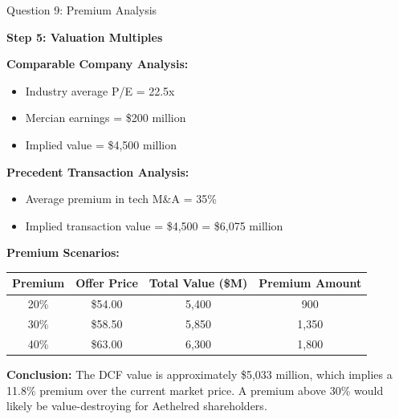 \documentclass[aspectratio=169]{beamer}
\begin{document}
	\begin{frame}{Question 9: Premium Analysis}
		
		\textbf{Step 5: Valuation Multiples}
		
		\textbf{Comparable Company Analysis:}
		\begin{itemize}
			\item Industry average P/E = 22.5x
			\item Mercian earnings = \$200 million
			\item Implied value = \$4,500 million
		\end{itemize}
		
		\textbf{Precedent Transaction Analysis:}
		\begin{itemize}
			\item Average premium in tech M&A = 35\%
			\item Implied transaction value = \$4,500  = \$6,075 million
		\end{itemize}
		
		\textbf{Premium Scenarios:}
		
		\begin{table}[h]
			\centering
			\begin{tabular}{|c|c|c|c|}
				\hline
				\textbf{Premium} & \textbf{Offer Price} & \textbf{Total Value (\$M)} & \textbf{Premium Amount} \\
				\hline
				20\% & \$54.00 & 5,400 & 900 \\
				30\% & \$58.50 & 5,850 & 1,350 \\
				40\% & \$63.00 & 6,300 & 1,800 \\
				\hline
			\end{tabular}
		\end{table}
		
		\textbf{Conclusion:}
		The DCF value is approximately \$5,033 million, which implies a 11.8\% premium over the current market price. A premium above 30\% would likely be value-destroying for Aethelred shareholders.
	\end{frame}
	
\end{document}
